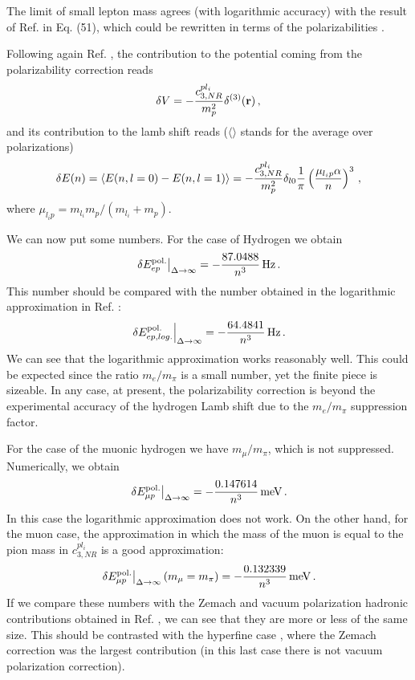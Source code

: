 \documentclass[a4paper,12pt]{article}
\newcommand{\be}{\begin{equation}}
\newcommand{\ee}{\end{equation}}
\def\al{\alpha}
\begin{document}
The limit of small lepton mass 
agrees (with logarithmic accuracy) with the result of Ref. \cite{Pineda:2004mx} in Eq. (51), which 
could be rewritten in terms of the polarizabilities \cite{Friar:1997tr,KS}.

Following again Ref. \cite{Pineda:2004mx}, the contribution to the potential coming from the polarizability correction reads 
\be
\delta V = -{ c_{3,NR}^{pl_i} \over m_p^2}\delta^{(3)}({\bf r})
\,,
\ee
and its contribution to the lamb shift reads ($\langle \rangle$ stands for the average over polarizations)
\be
\delta E(n)=\langle E(n,l=0)-E(n,l=1) \rangle =-{ c_{3,NR}^{pl_i} \over m_p^2}\delta_{l0}{1 \over \pi}
\left(
{\mu_{l_ip}\al \over n}
\right)^3
\,,
\ee
where $\mu_{l_ip}=m_{l_i}m_p/(m_{l_i}+m_p)$.

We can now put some numbers. For the case of Hydrogen we obtain  
\be
\left.
\delta E_{e p}^{\rm pol.}\right|_{\Delta 
\rightarrow \infty}= -\frac{87.0488}{n^3}\,{\rm Hz}
\,.
\ee
This number should be compared with the number obtained in the logarithmic approximation 
in Ref. \cite{Pineda:2004mx}:
$$
\left.
\delta E_{e p,log.}^{\rm pol.}\right|_{\Delta 
\rightarrow \infty}= -\frac{64.4841}{n^3}\,{\rm Hz}
\,.
$$
We can see that the logarithmic approximation works reasonably well. This could 
be expected since the ratio $m_e/m_{\pi}$ is a small number, yet the finite piece is sizeable. 
In any case, at present, the polarizability correction is beyond the experimental accuracy of the hydrogen Lamb shift 
due to the $m_e/m_{\pi}$ suppression factor. 

For the case of the muonic hydrogen we have $m_{\mu}/m_{\pi}$, which is not suppressed. Numerically, 
we obtain
\be
\left.\delta E_{\mu p}^{\rm pol.}\right|_{\Delta 
\rightarrow \infty}= -\frac{0.147614}{n^3}\,{\rm meV}
\,.
\ee
In this case the logarithmic approximation does not work. On the other hand, 
for the muon case, the approximation in which the mass of the muon is equal to the 
pion mass in $c_{3,NR}^{pl_i}$ is a good approximation:
\be
\left.\delta E_{\mu p}^{\rm pol.}\right|_{\Delta 
\rightarrow \infty}(m_{\mu}=m_{\pi})= -\frac{0.132339}{n^3}\,{\rm meV}
\,.
\ee
If we compare these numbers with the Zemach and vacuum polarization
hadronic contributions obtained in Ref. \cite{Pineda:2004mx}, we can 
see that they are more or less of the same size. This should be 
contrasted with the hyperfine case \cite{Pineda:2002as}, 
where the Zemach correction was the largest contribution 
(in this last case there is not vacuum polarization correction). 
\end{document}
